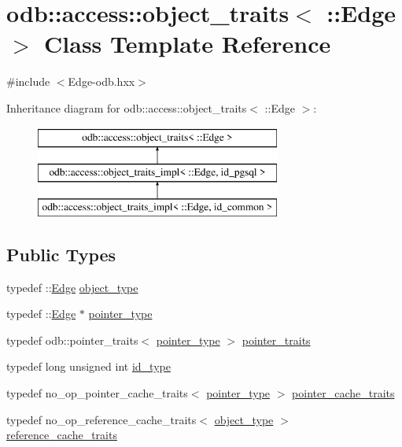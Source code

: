 \hypertarget{classodb_1_1access_1_1object__traits_3_01_1_1_edge_01_4}{}\section{odb\+:\+:access\+:\+:object\+\_\+traits$<$ \+:\+:Edge $>$ Class Template Reference}
\label{classodb_1_1access_1_1object__traits_3_01_1_1_edge_01_4}


{\ttfamily \#include $<$Edge-\/odb.\+hxx$>$}

Inheritance diagram for odb\+:\+:access\+:\+:object\+\_\+traits$<$ \+:\+:Edge $>$\+:\begin{figure}[H]
\begin{center}
\leavevmode
\includegraphics[height=3.000000cm]{d7/d68/classodb_1_1access_1_1object__traits_3_01_1_1_edge_01_4}
\end{center}
\end{figure}
\subsection*{Public Types}
\begin{DoxyCompactItemize}
\item 
typedef \+::\hyperlink{class_edge}{Edge} \hyperlink{classodb_1_1access_1_1object__traits_3_01_1_1_edge_01_4_aa59b45e2ea5605bb105c5a3e10b06f6a}{object\+\_\+type}
\item 
typedef \+::\hyperlink{class_edge}{Edge} $\ast$ \hyperlink{classodb_1_1access_1_1object__traits_3_01_1_1_edge_01_4_a6a628367452cbd6238b20d5cddbaadb5}{pointer\+\_\+type}
\item 
typedef odb\+::pointer\+\_\+traits$<$ \hyperlink{classodb_1_1access_1_1object__traits_3_01_1_1_edge_01_4_a6a628367452cbd6238b20d5cddbaadb5}{pointer\+\_\+type} $>$ \hyperlink{classodb_1_1access_1_1object__traits_3_01_1_1_edge_01_4_ab9aae724e12acc5ce3a479fa5d4a70aa}{pointer\+\_\+traits}
\item 
typedef long unsigned int \hyperlink{classodb_1_1access_1_1object__traits_3_01_1_1_edge_01_4_aa7a6b0b1f3e88e5a4aa341d0592f1661}{id\+\_\+type}
\item 
typedef no\+\_\+op\+\_\+pointer\+\_\+cache\+\_\+traits$<$ \hyperlink{classodb_1_1access_1_1object__traits_3_01_1_1_edge_01_4_a6a628367452cbd6238b20d5cddbaadb5}{pointer\+\_\+type} $>$ \hyperlink{classodb_1_1access_1_1object__traits_3_01_1_1_edge_01_4_aee6e22c8353f7ba19b3ae8cc93fe3bb7}{pointer\+\_\+cache\+\_\+traits}
\item 
typedef no\+\_\+op\+\_\+reference\+\_\+cache\+\_\+traits$<$ \hyperlink{classodb_1_1access_1_1object__traits_3_01_1_1_edge_01_4_aa59b45e2ea5605bb105c5a3e10b06f6a}{object\+\_\+type} $>$ \hyperlink{classodb_1_1access_1_1object__traits_3_01_1_1_edge_01_4_a54ca62d99b19a28da216205b7facfdf0}{reference\+\_\+cache\+\_\+traits}
\end{DoxyCompactItemize}
